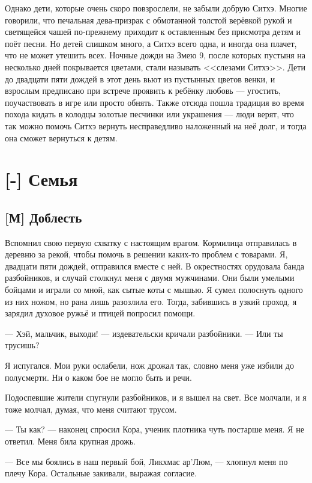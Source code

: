 Однако дети, которые очень скоро повзрослели, не забыли добрую Ситхэ.
Многие говорили, что печальная дева-призрак с обмотанной толстой верёвкой рукой и светящейся чашей по-прежнему приходит к оставленным без присмотра детям и поёт песни.
Но детей слишком много, а Ситхэ всего одна, и иногда она плачет, что не может утешить всех.
Ночные дожди на Змею 9, после которых пустыня на несколько дней покрывается цветами, стали называть <<слезами Ситхэ>>.
Дети до двадцати пяти дождей в этот день вьют из пустынных цветов венки, и взрослым предписано при встрече проявить к ребёнку любовь --- угостить, поучаствовать в игре или просто обнять.
Также отсюда пошла традиция во время похода кидать в колодцы золотые песчинки или украшения --- люди верят, что так можно помочь Ситхэ вернуть несправедливо наложенный на неё долг, и тогда она сможет вернуться к детям.

\chapter{[-] Семья}

\section{[М] Доблесть}

\textspace

Вспомнил свою первую схватку с настоящим врагом.
Кормилица отправилась в деревню за рекой, чтобы помочь в решении каких-то проблем с товарами.
Я, двадцати пяти дождей, отправился вместе с ней.
В окрестностях орудовала банда разбойников, и случай столкнул меня с двумя мужчинами.
Они были умелыми бойцами и играли со мной, как сытые коты с мышью.
Я сумел полоснуть одного из них ножом, но рана лишь разозлила его.
Тогда, забившись в узкий проход, я зарядил духовое ружьё и птицей попросил помощи.

--- Хэй, мальчик, выходи! --- издевательски кричали разбойники.
--- Или ты трусишь?

Я испугался.
Мои руки ослабели, нож дрожал так, словно меня уже избили до полусмерти.
Ни о каком бое не могло быть и речи.

Подоспевшие жители спугнули разбойников, и я вышел на свет.
Все молчали, и я тоже молчал, думая, что меня считают трусом.

--- Ты как? --- наконец спросил Кора, ученик плотника чуть постарше меня.
Я не ответил.
Меня била крупная дрожь.

--- Все мы боялись в наш первый бой, Ликхмас ар’Люм, --- хлопнул меня по плечу Кора.
Остальные закивали, выражая согласие.

